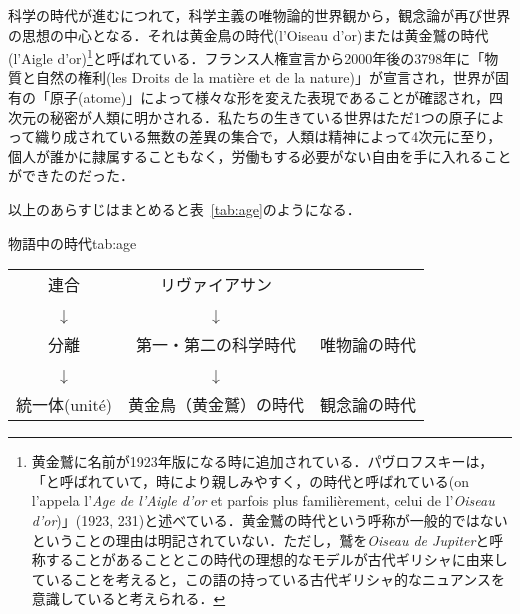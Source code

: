 科学の時代が進むにつれて，科学主義の唯物論的世界観から，観念論が再び世界の思想の中心となる．それは黄金鳥の時代(l'Oiseau d'or)または黄金鷲の時代(l'Aigle d'or)\footnote{黄金鷲に名前が1923年版になる時に追加されている．パヴロフスキーは，「と呼ばれていて，時により親しみやすく，の時代と呼ばれている(on l'appela l'\emph{Age de l'Aigle d'or} et parfois plus familièrement, celui de l'\emph{Oiseau d'or})」(1923, 231)と述べている．黄金鷲の時代という呼称が一般的ではないということの理由は明記されていない．ただし，鷲を\emph{Oiseau de Jupiter}と呼称することがあることとこの時代の理想的なモデルが古代ギリシャに由来していることを考えると，この語の持っている古代ギリシャ的なニュアンスを意識していると考えられる．}と呼ばれている．フランス人権宣言から2000年後の3798年に「物質と自然の権利(les Droits de la matière et de la nature)」が宣言され，世界が固有の「原子(atome)」によって様々な形を変えた表現であることが確認され，四次元の秘密が人類に明かされる．私たちの生きている世界はただ1つの原子によって織り成されている無数の差異の集合で，人類は精神によって4次元に至り，個人が誰かに隷属することもなく，労働もする必要がない自由を手に入れることができたのだった．

以上のあらすじはまとめると表~\ref{tab:age}のようになる．

\begin{mytab}[htbp]{物語中の時代}{tab:age} \begin{tabular}{c|c|c}
  連合 & リヴァイアサン & 　\\
  ↓& ↓ & 　 \\
  分離 & 第一・第二の科学時代 & 唯物論の時代\\
  ↓ & ↓ & 　\\
  統一体(unité) & 黄金鳥（黄金鷲）の時代 & 観念論の時代\\
\end{tabular}
\end{mytab}

